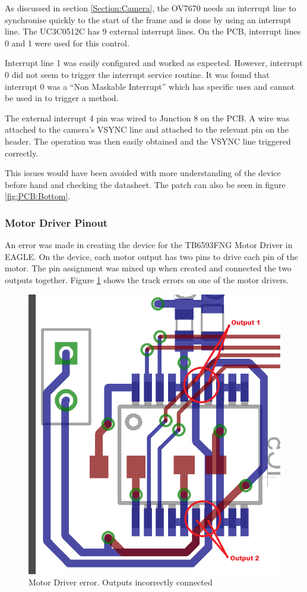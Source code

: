 As discussed in section \ref{Section:Camera}, the OV7670 needs an interrupt line to synchronise quickly to the start of the frame and is done by using an interrupt line. The UC3C0512C has 9 external interrupt lines. On the PCB, interrupt lines 0 and 1 were used for this control.

Interrupt line 1 was easily configured and worked as expected. However, interrupt 0 did not seem to trigger the interrupt service routine. It was found that interrupt 0 was a ``Non Maskable Interrupt'' which has specific uses and cannot be used in to trigger a method. 

The external interrupt 4 pin was wired to Junction 8 on the PCB. A wire was attached to the camera's VSYNC line and attached to the relevant pin on the header. The operation was then easily obtained and the VSYNC line triggered correctly.

This issues would have been avoided with more understanding of the device before hand and checking the datasheet. The patch can also be seen in figure \ref{fig:PCB:Bottom}.


\subsubsection{Motor Driver Pinout}

An error was made in creating the device for the TB6593FNG Motor Driver in EAGLE. On the device, each motor output has two pins to drive each pin of the motor. The pin assignment was mixed up when created and connected the two outputs together. Figure \ref{fig:Motor:Error} shows the track errors on one of the motor drivers. 

\begin{figure}
\centering
\includegraphics[width = \textwidth /2]{./Figures/MotorDriver_error.png}
\caption{Motor Driver error. Outputs incorrectly connected}
\label{fig:Motor:Error}
\end{figure}

